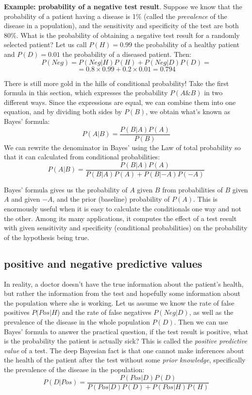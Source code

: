 \documentclass[
]{book}
\theoremstyle{definition}
\theoremstyle{definition}
\theoremstyle{definition}
\theoremstyle{remark}
\begin{document}
\textbf{Example: probability of a negative test result}. Suppose we know that the probability of a patient having a disease is 1\% (called the \emph{prevalence} of the disease in a population), and the sensitivity and specificity of the test are both 80\%. What is the probability of obtaining a negative test result for a randomly selected patient? Let us call \(P(H) = 0.99\) the probability of a healthy patient and \(P(D) = 0.01\) the probability of a diseased patient. Then:
\[ P(Neg) =  P(Neg | H) P(H) + P(Neg | D)P(D)  = \]
\[ = 0.8 \times 0.99 + 0.2 \times 0.01 = 0.794\]

There is still more gold in the hills of conditional probability! Take the first formula in this section, which expresses the probability \(P(A \& B)\) in two different ways. Since the expressions are equal, we can combine them into one equation, and by dividing both sides by \(P(B)\), we obtain what's known as Bayes' formula:
\[ P(A|B) = \frac{P(B|A) P(A)}{P(B) }\]
We can rewrite the denominator in Bayes' using the Law of total probability so that it can calculated from conditional probabilities:
\[
P(A|B) = \frac{P(B|A)P(A)}{P(B|A) P(A) + P(B|-A)P(-A)}
\]

Bayes' formula gives us the probability of \(A\) given \(B\) from probabilities of \(B\) given \(A\) and given \(-A\), and the prior (baseline) probability of \(P(A)\). This is enormously useful when it is easy to calculate the conditionals one way and not the other. Among its many applications, it computes the effect of a test result with given sensitivity and specificity (conditional probabilities) on the probability of the hypothesis being true.

\hypertarget{positive-and-negative-predictive-values}{%
\subsection{positive and negative predictive values}\label{positive-and-negative-predictive-values}}

In reality, a doctor doesn't have the true information about the patient's health, but rather the information from the test and hopefully some information about the population where she is working. Let us assume we know the rate of false positives \(P(Pos | H\)) and the rate of false negatives \(P(Neg | D)\), as well as the prevalence of the disease in the whole population \(P(D)\). Then we can use Bayes' formula to answer the practical question, if the test result is positive, what is the probability the patient is actually sick? This is called the \emph{positive predictive value} of a test. The deep Bayesian fact is that one cannot make inferences about the health of the patient after the test without some \emph{prior knowledge}, specifically the prevalence of the disease in the population:
\[ P(D | Pos) =  \frac{P(Pos|D)P(D)}{P(Pos|D) P(D) + P(Pos | H)P(H)}\]
\end{document}
